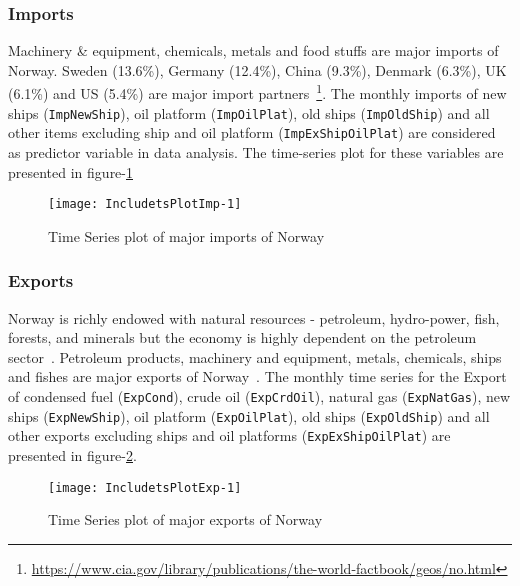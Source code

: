 \documentclass[12pt, lot, lof]{thesis}\usepackage[]{graphicx}\usepackage[]{color}
\makeatletter
\def\maxwidth{ %
  \ifdim\Gin@nat@width>\linewidth
    \linewidth
  \else
    \Gin@nat@width
  \fi
}
\makeatother
\begin{document}
\subsubsection{Imports}
\label{sssec:imports}
Machinery \& equipment, chemicals, metals and food stuffs are major imports of Norway. Sweden (13.6\%), Germany (12.4\%), China (9.3\%), Denmark (6.3\%), UK (6.1\%) and US (5.4\%) are major import partners~\footnote{\url{https://www.cia.gov/library/publications/the-world-factbook/geos/no.html}}. The monthly imports of new ships (\texttt{ImpNewShip}), oil platform (\texttt{ImpOilPlat}), old ships (\texttt{ImpOldShip}) and all other items excluding ship and oil platform (\texttt{ImpExShipOilPlat}) are considered as predictor variable in data analysis. The time-series plot for these variables are presented in figure-\ref{fig:tsPlotImp}
\begin{Schunk}
\begin{figure}

{\centering \texttt{[image: IncludetsPlotImp-1]} 

}

\caption[Time Series plot of major imports of Norway]{Time Series plot of major imports of Norway\label{fig:tsPlotImp}}
\end{figure}
\end{Schunk}

\subsubsection{Exports}
\label{sssec:exports}
Norway is richly endowed with natural resources - petroleum, hydro-power, fish, forests, and minerals but the economy is highly dependent on the petroleum sector~\footnotemark[\value{footnote}]. Petroleum products, machinery and equipment, metals, chemicals, ships and fishes are major exports of Norway~\footnotemark[\value{footnote}]. The monthly time series for the Export of condensed fuel (\texttt{ExpCond}), crude oil (\texttt{ExpCrdOil}), natural gas (\texttt{ExpNatGas}), new ships (\texttt{ExpNewShip}), oil platform (\texttt{ExpOilPlat}), old ships (\texttt{ExpOldShip}) and all other exports excluding ships and oil platforms (\texttt{ExpExShipOilPlat}) are presented in figure-\ref{fig:tsPlotExp}.
\begin{Schunk}
\begin{figure}

{\centering \texttt{[image: IncludetsPlotExp-1]} 

}

\caption[Time Series plot of major exports of Norway]{Time Series plot of major exports of Norway\label{fig:tsPlotExp}}
\end{figure}
\end{Schunk}
\end{document}
